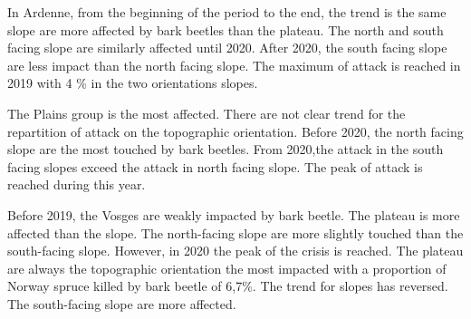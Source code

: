 \documentclass[3p,procedia]{elsarticle}
\begin{document}
In Ardenne, from the beginning of the period to the end, the trend is the same slope are more affected by bark beetles than the plateau. 
The north and south facing slope are similarly affected until 2020. 
After 2020, the south facing slope are less impact than the north facing slope. 
The maximum of attack is reached in 2019 with 4 \% in the two orientations slopes.

The Plains group is the most affected. 
There are not clear trend for the repartition of attack on the topographic orientation.
Before 2020, the north facing slope are the most touched by bark beetles.
From 2020,the attack in the south facing slopes exceed the attack in north facing slope. 
The peak of attack is reached during this year.

Before 2019, the Vosges are weakly impacted by bark beetle. 
The plateau is more affected than the slope.
The north-facing slope are more slightly touched than the south-facing slope. 
However, in 2020 the peak of the crisis is reached. 
The plateau are always the topographic orientation the most impacted with a proportion of Norway spruce killed by bark beetle of 6,7\%.
The trend for slopes has reversed. 
The south-facing slope are more affected. 



  

 
 
\end{document}
